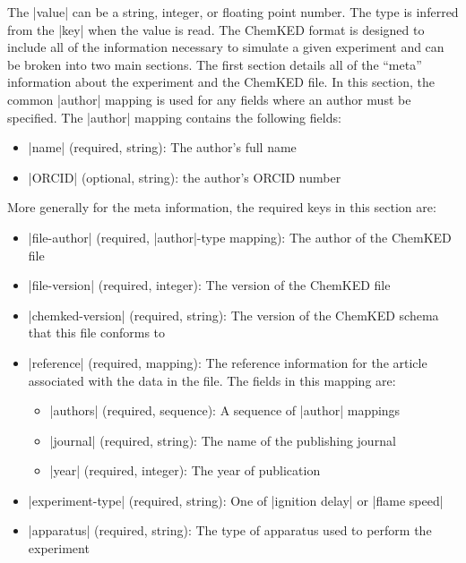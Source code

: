 \documentclass[12pt]{ussci}
\newcommand\ck{ChemKED}
\begin{document}
The \yaml|value| can be a string, integer, or floating point number. The type is
inferred from the \yaml|key| when the value is read. The \ck{} format is
designed to include all of the information necessary to simulate a given
experiment and can be broken into two main sections. The first section details
all of the ``meta'' information about the experiment and the \ck{} file. In this
section, the common \yaml|author| mapping is used for any fields where an author
must be specified. The \yaml|author| mapping contains the following fields:
%
\begin{itemize}
    \item \yaml|name| (required, string): The author's full name
    \item \yaml|ORCID| (optional, string): the author's ORCID number
\end{itemize}
%
More generally for the meta information, the required keys in this section
are:
%
\begin{itemize}
    \item \yaml|file-author| (required, \yaml|author|-type mapping): The author
    of the \ck{} file
    \item \yaml|file-version| (required, integer): The version of the \ck{} file
    \item \yaml|chemked-version| (required, string): The version of the \ck{}
    schema that this file conforms to
    \item \yaml|reference| (required, mapping): The reference information for
    the article associated with the data in the file. The fields in this
    mapping are:
    \begin{itemize}
        \item \yaml|authors| (required, sequence): A sequence of \yaml|author|
        mappings
        \item \yaml|journal| (required, string): The name of the publishing
        journal
        \item \yaml|year| (required, integer): The year of publication
    \end{itemize}
    \item \yaml|experiment-type| (required, string): One of \yaml|ignition
    delay| or \yaml|flame speed|
    \item \yaml|apparatus| (required, string): The type of apparatus used to
    perform the experiment
\end{itemize}
\end{document}

